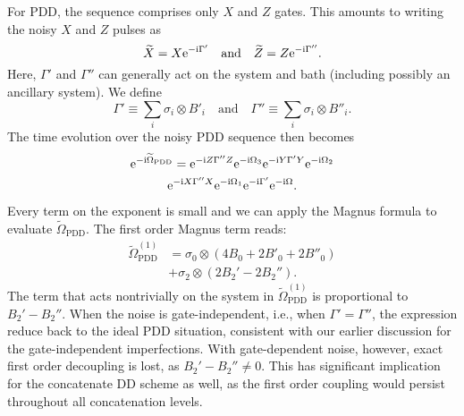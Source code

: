 \documentclass[pra,reprint,superscriptaddress]{revtex4-2}
\begin{document}
For PDD, the sequence comprises only $X$ and $Z$ gates. This amounts to writing the noisy $X$ and $Z$ pulses as
\begin{equation}\label{eq:gatedep-noise}
\widetilde{X} = X \mathrm{e}^{-\mathrm{i} \Gamma'}\quad\textrm{and}\quad \widetilde{Z} = Z \mathrm{e}^{-\mathrm{i} \Gamma''}.
\end{equation}
Here, $\Gamma'$ and $\Gamma''$ can generally act on the system and bath (including possibly an ancillary system). 
We define
\begin{equation}
\Gamma' \equiv \sum_i \sigma_i \otimes B'_i \quad \text{and} \quad
\Gamma'' \equiv \sum_i \sigma_i \otimes B''_i.
\end{equation}
The time evolution over the noisy PDD sequence then becomes
\begin{multline}
\mathrm{e}^{-\mathrm{i} \widetilde\Omega_\mathrm{PDD} } =
 \mathrm{e}^{-\mathrm{i} Z \Gamma'' Z} \mathrm{e}^{-\mathrm{i} \Omega_3}
 \mathrm{e}^{-\mathrm{i} Y \Gamma' Y} \mathrm{e}^{-\mathrm{i} \Omega_2}\\
  \mathrm{e}^{-\mathrm{i} X \Gamma'' X} \mathrm{e}^{-\mathrm{i} \Omega_1}
    \mathrm{e}^{-\mathrm{i} \Gamma'} \mathrm{e}^{-\mathrm{i} \Omega}.
\end{multline}
Every term on the exponent is small and we can apply the Magnus formula to evaluate $\widetilde\Omega_\mathrm{PDD}$.
The first order Magnus term reads: 
\begin{equation}\label{eq:PDD-gatedep-Mag1}
\begin{aligned}
 \widetilde{\Omega}_\mathrm{PDD}^{(1)} 
&= \sigma_0 \otimes (4B_0 + 2 B'_0 + 2B''_0) \\
&+ \sigma_2 \otimes (2B_2'-2B_2'').
\end{aligned}
\end{equation}
The term that acts nontrivially on the system in $\widetilde \Omega_\mathrm{PDD}^{(1)}$ is proportional to $B_2'-B_2''$.  When the noise is gate-independent, i.e., when $\Gamma'=\Gamma''$, the expression reduce back to the ideal PDD situation, consistent with our earlier discussion for the gate-independent imperfections. 
With gate-dependent noise, however, exact first order decoupling is lost, as $B_2'-B_2''\neq 0$.
This has significant implication for the concatenate DD scheme as well, 
as the first order coupling would persist throughout all concatenation levels. 
\end{document}
